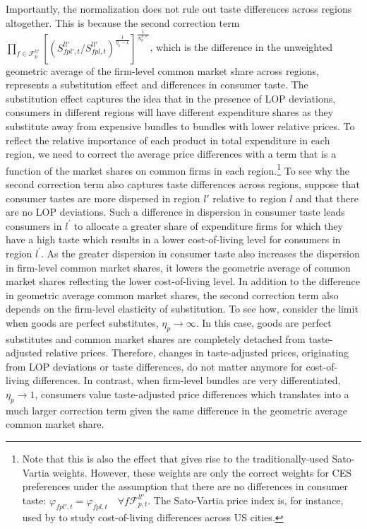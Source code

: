 \noindent Importantly, the normalization does not rule out taste differences across regions altogether. This is because the second correction term $\prod_{f \in \mathcal{F}^{ll'}_{p}} \left[\left(S^{ll'}_{fpl',t}\bigg / S^{ll'}_{fpl,t}\right)^{\frac{1}{\eta_p-1}}\right]^{\frac{1}{N^{F,ll'}_p}}$, which is the difference in the unweighted geometric average of the firm-level common market share across regions, represents a substitution effect and differences in consumer taste. The substitution effect captures the idea that in the presence of LOP deviations, consumers in different regions will have different expenditure shares as they substitute away from expensive bundles to bundles with lower relative prices. To reflect the relative importance of each product in total expenditure in each region, we need to correct the average price differences with a term that is a function of the market shares on common firms in each region.\footnote{Note that this is also the effect that gives rise to the traditionally-used Sato-Vartia weights. However, these weights are only the correct weights for CES preferences under the assumption that there are no differences in consumer taste: $\varphi_{fpl',t} = \varphi_{fpl,t} \quad \forall f \mathcal{F}^{ll'}_{p,t}$. The Sato-Vartia price index is, for instance, used by \citet{Handbury2015} to study cost-of-living differences across US cities.} To see why the second correction term also captures taste differences across regions, suppose that consumer tastes are more dispersed in region $l'$ relative to region $l$ and that there are no LOP deviations. Such a difference in dispersion in consumer taste leads consumers in $l^{'}$ to allocate a greater share of expenditure firms for which they have a high taste which results in a lower cost-of-living level for consumers in region $l^{'}$. As the greater dispersion in consumer taste also increases the dispersion in firm-level common market shares, it lowers the geometric average of common market shares reflecting the lower cost-of-living level. In addition to the difference in geometric average common market shares, the second correction term also depends on the firm-level elasticity of substitution. To see how, consider the limit when goods are perfect substitutes, $\eta_p \rightarrow\infty$. In this case, goods are perfect substitutes and common market shares are completely detached from taste-adjusted relative prices. Therefore, changes in taste-adjusted prices, originating from LOP deviations or taste differences, do not matter anymore for cost-of-living differences. In contrast, when firm-level bundles are very differentiated,  $\eta_p \rightarrow 1$, consumers value taste-adjusted price differences which translates into a much larger correction term given the same difference in the geometric average common market share.

